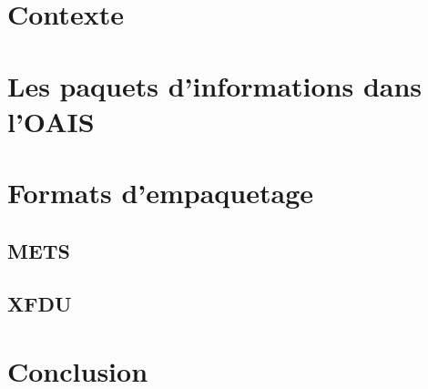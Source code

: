 \documentclass[12pt,a4paper]{article} %
\begin{document}
\section{Contexte} %

\section{Les paquets d'informations dans l'OAIS}

\section{Formats d'empaquetage}

\subsection{METS}

\subsection{XFDU}

\section{Conclusion}


\printbibliography

\tableofcontents %
\end{document}

